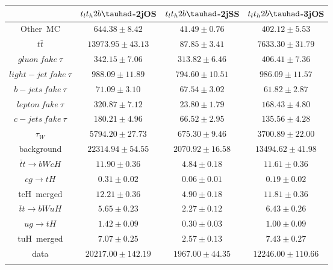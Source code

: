 \centering
\begin{tabular}{cccc} \toprule\toprule
 & $t_{l}t_{h}2b\tauhad$-2jOS & $t_{l}t_{h}2b\tauhad$-2jSS & $t_{l}t_{h}2b\tauhad$-3jOS \\\midrule
Other~MC & $644.38\pm8.42$ & $41.49\pm0.76$ & $402.12\pm5.53$ \\
$t\bar{t}$ & $13973.95\pm43.13$ & $87.85\pm3.41$ & $7633.30\pm31.79$\\
$gluon~fake~\tau$ & $342.15\pm7.06$ & $313.82\pm6.46$ & $406.41\pm7.36$\\
$light-jet~fake~\tau$ & $988.09\pm11.89$ & $794.60\pm10.51$ & $986.09\pm11.57$\\
$b-jets~fake~\tau$ & $71.09\pm3.10$ & $67.54\pm3.02$ & $61.82\pm2.87$\\
$lepton~fake~\tau$ & $320.87\pm7.12$ & $23.80\pm1.79$ & $168.43\pm4.80$\\
$c-jets~fake~\tau$ & $180.21\pm4.96$ & $66.52\pm2.95$ & $135.56\pm4.28$\\
$\tau_{W}$ & $5794.20\pm27.73$ & $675.30\pm9.46$ & $3700.89\pm22.00$\\
background & $22314.94\pm54.55$ & $2070.92\pm16.58$ & $13494.62\pm41.98$\\\midrule
$\bar{t}t\to bWcH$ & $11.90\pm0.36$ & $4.84\pm0.18$ & $11.61\pm0.36$\\
$cg\to tH$ & $0.31\pm0.02$ & $0.06\pm0.01$ & $0.19\pm0.02$\\
tcH~merged & $12.21\pm0.36$ & $4.90\pm0.18$ & $11.81\pm0.36$\\
$\bar{t}t\to bWuH$ & $5.65\pm0.23$ & $2.27\pm0.12$ & $6.43\pm0.26$\\
$ug\to tH$ & $1.42\pm0.09$ & $0.30\pm0.03$ & $1.00\pm0.09$\\
tuH~merged & $7.07\pm0.25$ & $2.57\pm0.13$ & $7.43\pm0.27$\\\midrule
data & $20217.00\pm142.19$ & $1967.00\pm44.35$ & $12246.00\pm110.66$\\
\bottomrule\bottomrule\\
\end{tabular}

